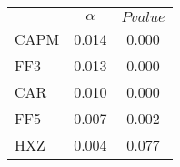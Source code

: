 \begin{tabular}{lcc}
\toprule
 & $\alpha$ & $Pvalue$ \\
\midrule
CAPM & 0.014 & 0.000 \\
FF3 & 0.013 & 0.000 \\
CAR & 0.010 & 0.000 \\
FF5 & 0.007 & 0.002 \\
HXZ & 0.004 & 0.077 \\
\bottomrule
\end{tabular}
